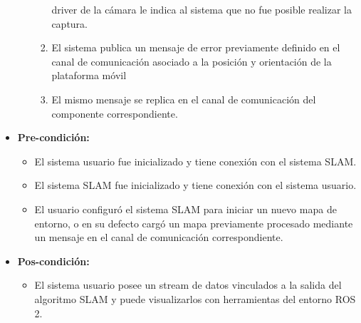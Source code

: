 \documentclass[12pt,a4paper, twosite]{article}
\begin{document}
\begin{itemize}
\begin{itemize}
\begin{enumerate}
      driver de la cámara le indica al sistema que no fue posible realizar la captura.
      \item El sistema publica un mensaje de error previamente definido en el canal de
      comunicación asociado a la posición y orientación de la plataforma móvil
      \item El mismo mensaje se replica en el canal de comunicación del componente
      correspondiente.
    \end{enumerate}
  \end{itemize}
  \item \textbf{Pre-condición:}
  \begin{itemize}
    \item El sistema usuario fue inicializado y tiene conexión con el sistema SLAM.
    \item El sistema SLAM fue inicializado y tiene conexión con el sistema usuario.
    \item El usuario configuró el sistema SLAM para iniciar un nuevo mapa de entorno, o en su
    defecto cargó un mapa previamente procesado mediante un mensaje en el canal de
    comunicación correspondiente.
  \end{itemize}
  \item \textbf{Pos-condición:}
  \begin{itemize}
    \item El sistema usuario posee un stream de datos vinculados a la salida del algoritmo SLAM
    y puede visualizarlos con herramientas del entorno ROS 2.
  \end{itemize}
\end{itemize}




\end{document}
